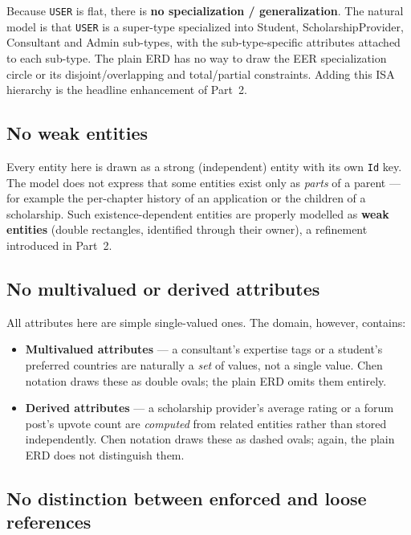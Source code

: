 \documentclass[11pt,a4paper]{article}
\begin{document}
Because \texttt{USER} is flat, there is \textbf{no specialization /
generalization}. The natural model is that \texttt{USER} is a super-type
specialized into Student, ScholarshipProvider, Consultant and Admin sub-types, with the
sub-type-specific attributes attached to each sub-type. The plain ERD has no
way to draw the EER specialization circle or its disjoint/overlapping and
total/partial constraints. Adding this ISA hierarchy is the headline
enhancement of Part~2.

\subsection{No weak entities}

Every entity here is drawn as a strong (independent) entity with its own
\texttt{Id} key. The model does not express that some entities exist only as
\emph{parts} of a parent --- for example the per-chapter history of an
application or the children of a scholarship. Such existence-dependent
entities are properly modelled as \textbf{weak entities} (double rectangles,
identified through their owner), a refinement introduced in Part~2.

\subsection{No multivalued or derived attributes}

All attributes here are simple single-valued ones. The domain, however,
contains:

\begin{itemize}[leftmargin=1.4em]
  \item \textbf{Multivalued attributes} --- a consultant's expertise tags or a
        student's preferred countries are naturally a \emph{set} of values, not
        a single value. Chen notation draws these as double ovals; the plain
        ERD omits them entirely.
  \item \textbf{Derived attributes} --- a scholarship provider's average rating
        or a forum post's upvote count are \emph{computed} from related
        entities rather than stored independently. Chen notation draws these as
        dashed ovals; again, the plain ERD does not distinguish them.
\end{itemize}

\subsection{No distinction between enforced and loose references}
\end{document}
